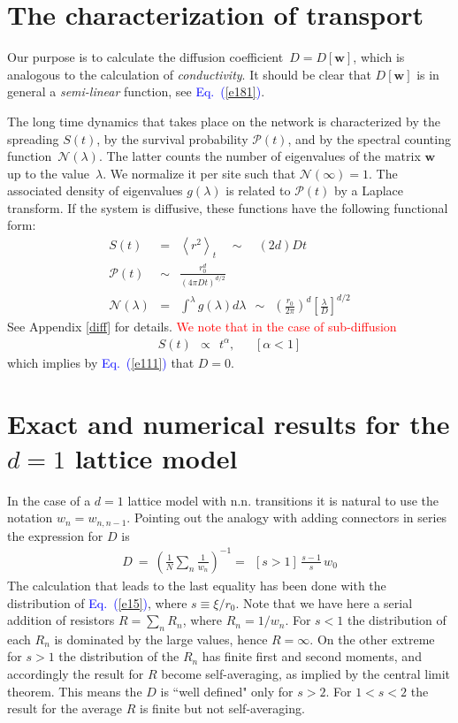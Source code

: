 \documentclass[aps,prb,floats,floatfix,twocolumn]{revtex4}
\newcommand{\beq}{\begin{eqnarray}}
\newcommand{\eeq}{\end{eqnarray}}
\newcommand{\Eq}[1]{\textcolor{blue}{Eq.\!\!~(\ref{#1})}}
\newcommand{\rmrk}[1]{\textcolor{red}{#1}}
\begin{document}
\section{The characterization of transport}

 
Our purpose is to calculate 
the diffusion coefficient~$D=D[\bm{w}]$, which is analogous to the 
calculation of {\em conductivity}. It should be clear 
that $D[\bm{w}]$ is in general a {\em semi-linear} function, see \Eq{e181}.

The long time dynamics that takes place on the network 
is characterized by the spreading $S(t)$, 
by the survival probability $\mathcal{P}(t)$, 
and by the spectral counting function~$\mathcal{N}(\lambda)$.
The latter counts the number of eigenvalues of 
the matrix $\bm{w}$ up to the value~$\lambda$.
We normalize it per site such that ${\mathcal{N}(\infty)=1}$.
The associated density of eigenvalues $g(\lambda)$ 
is related to $\mathcal{P}(t)$ by a Laplace transform.
%
If the system is diffusive, these functions
have the following functional form: 
%
\beq
S(t) &=& \left\langle r^2\right\rangle_t \quad\sim\quad  (2d)Dt\ \\
\mathcal{P}(t) &\sim&  \frac{r_0^d}{\left({4\pi D t}\right)^{d/2}} \\
\mathcal{N}(\lambda)  &=& \int^\lambda g(\lambda)d\lambda  
\ \ \sim \ \ \left(\frac{r_0}{2\pi}\right)^d\left[\frac{\lambda}{D}\right]^{d/2} 
\label{e6}
\eeq
%
See Appendix \ref{diff} for details.
\rmrk{We note that in the case of sub-diffusion} 
%
\beq
S(t) \ \ \propto \ \ t^{\alpha}, 
\ \ \ \ \ \ \ [\alpha<1]
\eeq
%
which implies by \Eq{e111} that ${D=0}$.



\section{Exact and numerical results for the $d{=}1$ lattice model}
\label{onedim}

In the case of a $d{=}1$ lattice model with n.n. transitions 
it is natural to use the notation $w_n=w_{n,n{-}1}$. 
Pointing out the analogy with adding connectors in series 
the expression for $D$ is 
%
\beq
D \ = \ \left( \frac{1}{N} \sum_n \frac{1}{w_n} \right)^{-1} 
= \ \ [s>1] \, \frac{s-1}{s} \, w_0
\eeq
%
The calculation that leads to the last equality 
has been done with the distribution of \Eq{e15}, 
where ${s \equiv \xi/r_0}$.  Note that we have 
here a serial addition of resistors $R=\sum_n R_n$, 
where ${R_n=1/w_n}$.  For ${s<1}$ the distribution 
of each $R_n$ is dominated by the large values, 
hence ${R=\infty}$. On the other extreme for ${s>1}$ 
the distribution of the $R_n$ has finite first and second moments,  
and accordingly the result for $R$ become self-averaging, 
as implied by the central limit theorem.
This means the $D$ is ``well defined" only for ${s>2}$. 
For ${1<s<2}$ the result for the average $R$ is finite 
but not self-averaging.
\end{document}
